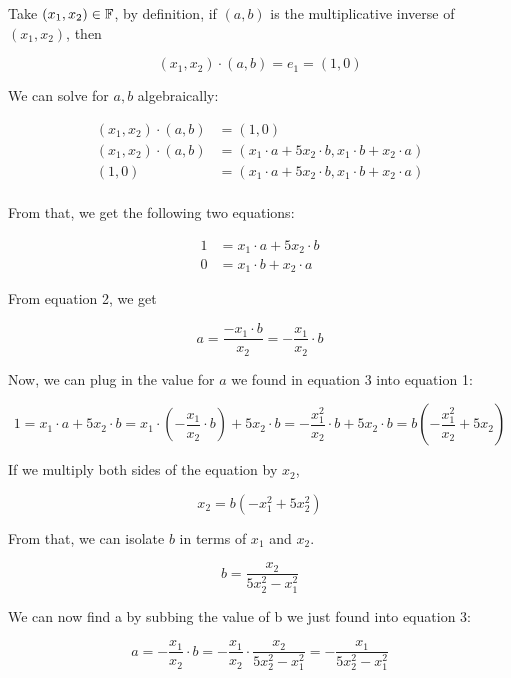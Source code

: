 \documentclass[12pt]{article} %
\begin{document}
\begin{homeworkProblem}
    Take $(x_1, x_2) \in \mathbb{F}$, by definition, if $(a, b)$ is the multiplicative inverse of $(x_1, x_2)$, then

    $$
        (x_1, x_2) \cdot (a, b) = e_1 = (1, 0)
    $$

    We can solve for $a, b$ algebraically:

    \begin{align*}
        (x_1, x_2) \cdot (a, b)
               & =(1, 0)                                                   \\
        (x_1, x_2) \cdot (a, b)
               & = (x_1 \cdot a + 5x_2 \cdot b, x_1 \cdot b + x_2 \cdot a) \\
        (1, 0) & = (x_1 \cdot a + 5x_2 \cdot b, x_1 \cdot b + x_2 \cdot a) \\
    \end{align*}

    From that, we get the following two equations:

    \begin{align}
        1 & = x_1 \cdot a + 5x_2 \cdot b \\
        0 & = x_1 \cdot b + x_2 \cdot a
    \end{align}

    From equation 2, we get

    \begin{equation}
        a = \frac{- x_1 \cdot b}{x_2} = - \frac{x_1}{x_2} \cdot b
    \end{equation}


    Now, we can plug in the value for $a$ we found in equation 3 into equation 1:


    $$
        1 = x_1 \cdot a + 5x_2 \cdot b = x_1 \cdot (- \frac{x_1}{x_2} \cdot b) + 5x_2 \cdot b = - \frac{x_1^2}{x_2} \cdot b + 5 x_2 \cdot b = b (-\frac{x_1^2}{x_2} + 5x_2)
    $$

    If we multiply both sides of the equation by $x_2$,


    $$
        x_2 = b (-x_1^2 + 5x_2^2)
    $$

    From that, we can isolate $b$ in terms of $x_1$ and $x_2$.

    $$
        b = \frac{x_2}{5x_2^2 - x_1^2}
    $$

    We can now find a by subbing the value of b we just found into equation 3:

    $$
        a = - \frac{x_1}{x_2} \cdot b = - \frac{x_1}{x_2} \cdot \frac{x_2}{5x_2^2 - x_1^2} = - \frac{x_1}{5x_2^2 - x_1^2}
    $$


\end{homeworkProblem}
\end{document}
